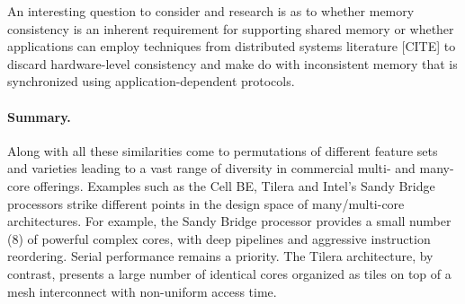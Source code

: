 An interesting question to consider and research is as to whether memory consistency is an inherent
requirement for supporting shared memory or whether applications can employ techniques from
distributed systems literature [CITE] to discard hardware-level consistency and make do with
inconsistent memory that is synchronized using application-dependent protocols.


\paragraph{Summary.} Along with all these similarities come to permutations of different feature sets
and varieties leading to a vast range of diversity in commercial multi- and many-core offerings. Examples
such as the Cell BE, Tilera and Intel's Sandy Bridge processors strike different points in the design space
of many/multi-core architectures. For example, the Sandy Bridge processor provides a small number (8)
of powerful complex cores, with deep pipelines and aggressive instruction reordering. Serial performance
remains a priority. The Tilera architecture, by contrast, presents a large number of identical cores organized
as tiles on top of a mesh interconnect with non-uniform access time.


